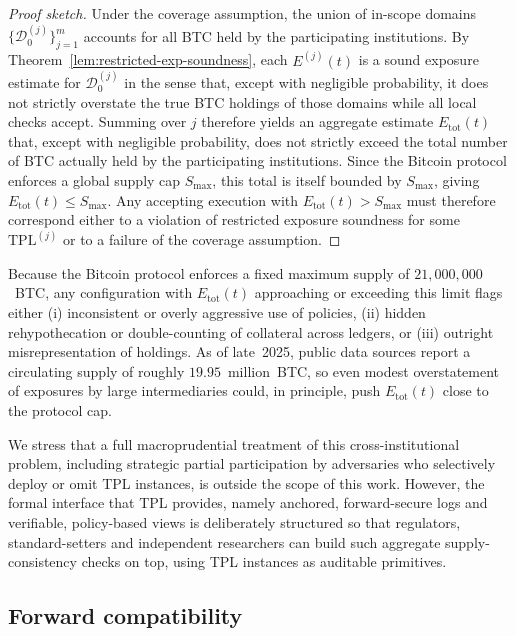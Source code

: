 \documentclass[11pt]{article}
\begin{document}
\begin{proof}[Proof sketch]
Under the coverage assumption, the union of in-scope domains
$\{\mathcal{D}_0^{(j)}\}_{j=1}^m$ accounts for all BTC held by the participating institutions.
By Theorem~\ref{lem:restricted-exp-soundness}, each $E^{(j)}(t)$ is a sound exposure estimate for
$\mathcal{D}_0^{(j)}$ in the sense that, except with negligible probability, it does not strictly
overstate the true BTC holdings of those domains while all local checks accept.
Summing over $j$ therefore yields an aggregate estimate $E_{\mathrm{tot}}(t)$ that, except with
negligible probability, does not strictly exceed the total number of BTC actually held by the
participating institutions.
Since the Bitcoin protocol enforces a global supply cap $S_{\max}$, this total is itself bounded
by $S_{\max}$, giving $E_{\mathrm{tot}}(t) \leq S_{\max}$.
Any accepting execution with $E_{\mathrm{tot}}(t) > S_{\max}$ must therefore correspond either to a
violation of restricted exposure soundness for some $\mathrm{TPL}^{(j)}$ or to a failure of the
coverage assumption.
\end{proof}
Because the Bitcoin protocol enforces a fixed maximum supply of $21{,}000{,}000$~BTC, any configuration with
$E_{\mathrm{tot}}(t)$ approaching or exceeding this limit flags either (i) inconsistent or overly aggressive
use of policies, (ii) hidden rehypothecation or double-counting of collateral across ledgers, or
(iii) outright misrepresentation of holdings.
As of late~2025, public data sources report a circulating supply of roughly $19.95$~million~BTC, so
even modest overstatement of exposures by large intermediaries could, in principle, push $E_{\mathrm{tot}}(t)$
close to the protocol cap.

We stress that a full macroprudential treatment of this cross-institutional problem, including strategic partial
participation by adversaries who selectively deploy or omit TPL instances, is outside the scope of
this work.
However, the formal interface that TPL provides, namely anchored, forward-secure logs and verifiable, policy-based
views is deliberately structured so that regulators, standard-setters and independent researchers can
build such aggregate supply-consistency checks on top, using TPL instances as auditable primitives.

\subsection{Forward compatibility}
\end{document}

